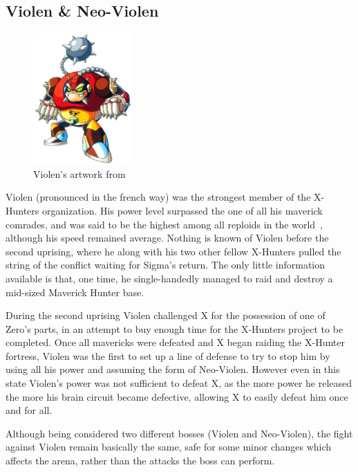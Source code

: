 \subsection{Violen \& Neo-Violen}\label{boss:Neo-Violen}
\begin{figure}[htp]
	\centering
	\includegraphics[height=5cm]{figures/X2/Hunter_stages/Violen.png}
	\caption{Violen's artwork from \cite{book:MMX_Complete_art}}
\end{figure}
Violen (pronounced in the french way) was the strongest member of the X-Hunters organization. His power level surpassed the one of all his maverick comrades, and was said to be the highest among all reploids in the world~\cite{wayback:X2_resources}, although his speed remained average. Nothing is known of Violen before the second uprising, where he along with his two other fellow X-Hunters pulled the string of the conflict waiting for Sigma's return. The only little information available is that, one time, he single-handedly managed to raid and destroy a mid-sized Maverick Hunter base. 

During the second uprising Violen challenged X for the possession of one of Zero's parts, in an attempt to buy enough time for the X-Hunters project to be completed. Once all mavericks were defeated and X began raiding the X-Hunter fortress, Violen was the first to set up a line of defense to try to stop him by using all his power and assuming the form of Neo-Violen. However even in this state Violen's power was not sufficient to defeat X, as the more power he released the more his brain circuit became defective, allowing X to easily defeat him once and for all.

Although being considered two different bosses (Violen and Neo-Violen), the fight against Violen remain basically the same, safe for some minor changes which affects the arena, rather than the attacks the boss can perform. 

